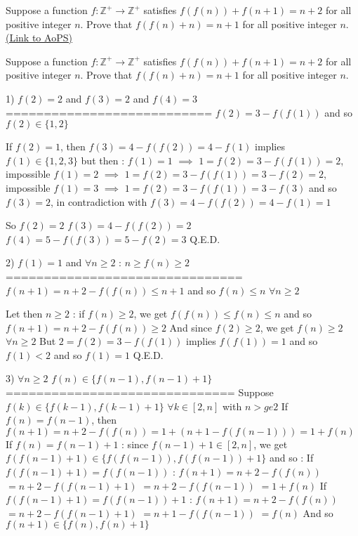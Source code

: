 \begin{problem}
	Suppose a function $f : \mathbb{Z}^+ \rightarrow \mathbb{Z}^+$ satisfies $f(f(n)) + f(n+1) = n+2$ for all positive integer $n$. Prove that $f(f(n)+n) = n+1$ for all positive integer $n$.
	\flushright \href{https://artofproblemsolving.com/community/c6h481881}{(Link to AoPS)}
\end{problem}



\begin{solution}
	\begin{tcolorbox}Suppose a function $f : \mathbb{Z}^+ \rightarrow \mathbb{Z}^+$ satisfies $f(f(n)) + f(n+1) = n+2$ for all positive integer $n$. Prove that $f(f(n)+n) = n+1$ for all positive integer $n$.\end{tcolorbox}
1) $f(2)=2$ and $f(3)=2$ and $f(4)=3$
===========================
$f(2)=3-f(f(1))$ and so $f(2)\in\{1,2\}$

If $f(2)=1$, then $f(3)=4-f(f(2))=4-f(1)$ implies $f(1)\in\{1,2,3\}$ but then :
$f(1)=1$ $\implies$ $1=f(2)=3-f(f(1))=2$, impossible
$f(1)=2$ $\implies$ $1=f(2)=3-f(f(1))=3-f(2)=2$, impossible
$f(1)=3$ $\implies$ $1=f(2)=3-f(f(1))=3-f(3)$ and so $f(3)=2$, in contradiction with $f(3)=4-f(f(2))=4-f(1)=1$

So $f(2)=2$
$f(3)=4-f(f(2))=2$
$f(4)=5-f(f(3))=5-f(2)=3$
Q.E.D.

2) $f(1)=1$ and $\forall n\ge 2$ : $n\ge f(n)\ge 2$
===============================
$f(n+1)=n+2-f(f(n))\le n+1$ and so $f(n)\le n$ $\forall n\ge 2$

Let then $n\ge 2$ : if $f(n)\ge 2$, we get $f(f(n))\le f(n)\le n$ and so $f(n+1)=n+2-f(f(n))\ge 2$
And since $f(2)\ge 2$, we get $f(n)\ge 2$ $\forall n\ge 2$
But $2=f(2)=3-f(f(1))$ implies $f(f(1))=1$ and so $f(1)<2$ and so $f(1)=1$
Q.E.D.

3) $\forall n\ge 2$ $f(n)\in\{f(n-1),f(n-1)+1\}$
==============================
Suppose $f(k)\in\{f(k-1),f(k-1)+1\}$ $\forall k\in[2,n]$ with $n>ge 2$
If $f(n)=f(n-1)$, then $f(n+1)=n+2-f(f(n))=1+(n+1-f(f(n-1)))=1+f(n)$
If $f(n)=f(n-1)+1$ : since $f(n-1)+1\in[2,n]$, we get $f(f(n-1)+1)\in\{f(f(n-1)),f(f(n-1))+1\}$ and so :
If $f(f(n-1)+1)=f(f(n-1))$ : $f(n+1)=n+2-f(f(n))$ $=n+2-f(f(n-1)+1)$ $=n+2-f(f(n-1))$ $=1+f(n)$
If $f(f(n-1)+1)=f(f(n-1))+1$ : $f(n+1)=n+2-f(f(n))$ $=n+2-f(f(n-1)+1)$ $=n+1-f(f(n-1))$ $=f(n)$
And so $f(n+1)\in\{f(n),f(n)+1\}$


\end{solution}
